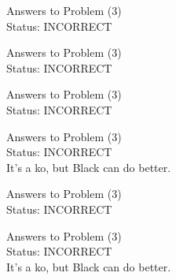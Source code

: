 \documentclass[11pt]{article}
\begin{document}
\begin{minipage}[t]{0.5\textwidth}
  {\centering
  
  Answers to Problem (3)\\
  Status: INCORRECT\\
  
  }
\end{minipage}
\begin{minipage}[t]{0.5\textwidth}
  {\centering
  
  Answers to Problem (3)\\
  Status: INCORRECT\\
  
  }
\end{minipage}
\begin{minipage}[t]{0.5\textwidth}
  {\centering
  
  Answers to Problem (3)\\
  Status: INCORRECT\\
  
  }
\end{minipage}
\begin{minipage}[t]{0.5\textwidth}
  {\centering
  
  Answers to Problem (3)\\
  Status: INCORRECT\\
  It's a ko, but Black can do better.\\
  }
\end{minipage}
\begin{minipage}[t]{0.5\textwidth}
  {\centering
  
  Answers to Problem (3)\\
  Status: INCORRECT\\
  
  }
\end{minipage}
\begin{minipage}[t]{0.5\textwidth}
  {\centering
  
  Answers to Problem (3)\\
  Status: INCORRECT\\
  It's a ko, but Black can do better.\\
  }
\end{minipage}
\end{document}
